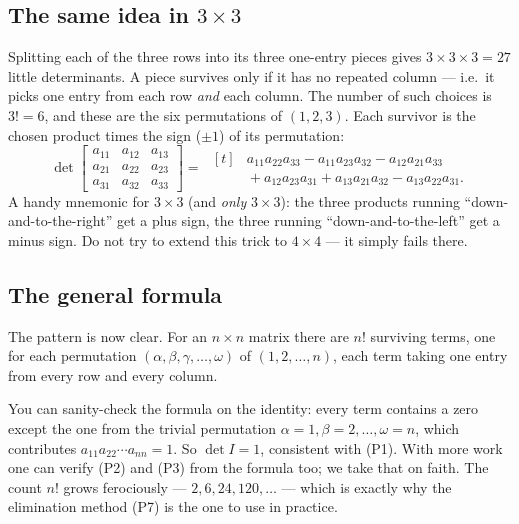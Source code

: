 \subsection{The same idea in \texorpdfstring{$3\times 3$}{3x3}}

Splitting each of the three rows into its three one-entry pieces gives $3\times 3\times 3=27$ little determinants. A piece survives only if it has no repeated column --- i.e.\ it picks one entry from each row \emph{and} each column. The number of such choices is $3!=6$, and these are the six permutations of $(1,2,3)$. Each survivor is the chosen product times the sign ($\pm1$) of its permutation:
\[
\det\begin{bmatrix} a_{11} & a_{12} & a_{13} \\ a_{21} & a_{22} & a_{23} \\ a_{31} & a_{32} & a_{33}\end{bmatrix}
=\;
\begin{aligned}[t]
& a_{11}a_{22}a_{33} - a_{11}a_{23}a_{32} - a_{12}a_{21}a_{33} \\
&{}+ a_{12}a_{23}a_{31} + a_{13}a_{21}a_{32} - a_{13}a_{22}a_{31} .
\end{aligned}
\]
A handy mnemonic for $3\times 3$ (and \emph{only} $3\times 3$): the three products running ``down-and-to-the-right'' get a plus sign, the three running ``down-and-to-the-left'' get a minus sign. Do not try to extend this trick to $4\times 4$ --- it simply fails there.

\subsection{The general formula}

The pattern is now clear. For an $n\times n$ matrix there are $n!$ surviving terms, one for each permutation $(\alpha,\beta,\gamma,\dots,\omega)$ of $(1,2,\dots,n)$, each term taking one entry from every row and every column.


You can sanity-check the formula on the identity: every term contains a zero except the one from the trivial permutation $\alpha=1,\beta=2,\dots,\omega=n$, which contributes $a_{11}a_{22}\cdots a_{nn}=1$. So $\det I=1$, consistent with (P1). With more work one can verify (P2) and (P3) from the formula too; we take that on faith. The count $n!$ grows ferociously --- $2,6,24,120,\dots$ --- which is exactly why the elimination method (P7) is the one to use in practice.

